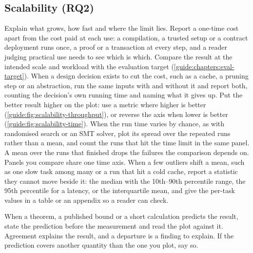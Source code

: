 \subsection[Scalability (RQ2)]{Scalability (RQ2)\skimmark}\label{guide:chapters:scalability}
Explain what grows, how fast and where the limit lies. Report a one-time cost apart from the cost paid at each use: a compilation, a trusted setup or a contract deployment runs once, a proof or a transaction at every step, and a reader judging practical use needs to see which is which. Compare the result at the intended scale and workload with the evaluation target (\cref{guide:chapters:eval-target}). When a design decision exists to cut the cost, such as a cache, a pruning step or an abstraction, run the same inputs with and without it and report both, counting the decision's own running time and naming what it gives up. Put the better result higher on the plot: use a metric where higher is better (\cref{guide:fig:scalability-throughput}), or reverse the axis when lower is better (\cref{guide:fig:scalability-time}). When the run time varies by chance, as with randomised search or an SMT solver, plot its spread over the repeated runs rather than a mean, and count the runs that hit the time limit in the same panel. A mean over the runs that finished drops the failures the comparison depends on. Panels you compare share one time axis. When a few outliers shift a mean, such as one slow task among many or a run that hit a cold cache, report a statistic they cannot move beside it: the median with the 10th--90th percentile range, the 95th percentile for a latency, or the interquartile mean, and give the per-task values in a table or an appendix so a reader can check.

When a theorem, a published bound or a short calculation predicts the result, state the prediction before the measurement and read the plot against it. Agreement explains the result, and a departure is a finding to explain. If the prediction covers another quantity than the one you plot, say so.

